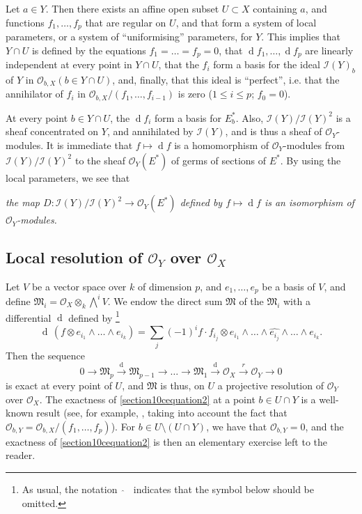 \documentclass{article}
\theoremstyle{plain}
\theoremstyle{definition}
\newcommand{\sh}{\mathscr}
\newcommand{\dd}{\operatorname{d}\!}
\renewcommand{\leq}{\leqslant}
\newcommand{\oldpage}[1]{\marginpar{\footnotesize$\Big\vert$ \textit{p.~#1}}}
\begin{document}
Let $a\in Y$.
Then there exists an affine open subset $U\subset X$ containing $a$, and functions $f_1,\ldots,f_p$ that are regular on $U$, and that form a system of local parameters, or a system of ``uniformising'' parameters, for $Y$.
This implies that $Y\cap U$ is defined by the equations $f_1=\ldots=f_p=0$, that $\dd f_1,\ldots,\dd f_p$ are linearly independent at every point in $Y\cap U$, that the $f_i$ form a basis for the ideal $\sh{I}(Y)_b$ of $Y$ in $\sh{O}_{b,X}(b\in Y\cap U)$, and, finally, that this ideal is ``perfect'', i.e. that the annihilator of $f_i$ in $\sh{O}_{b,X}/(f_1,\ldots,f_{i-1})$ is zero ($1\leq i\leq p$; $f_0=0$).

At every point $b\in Y\cap U$, the $\dd f_i$ form a basis for $E_b^*$.
Also, $\sh{I}(Y)/\sh{I}(Y)^2$ is a sheaf concentrated on $Y$, and annihilated by $\sh{I}(Y)$, and is thus a sheaf of $\sh{O}_Y$-modules.
It is immediate that $f\mapsto\dd f$ is a homomorphism of $\sh{O}_Y$-modules from $\sh{I}(Y)/\sh{I}(Y)^2$ to the sheaf $\sh{O}_Y(E^*)$ of germs of sections of $E^*$.
By using the local parameters, we see that

\medskip

\emph{the map $D\colon\sh{I}(Y)/\sh{I}(Y)^2 \to \sh{O}_Y(E^*)$ defined by $f\mapsto\dd f$ is an isomorphism of $\sh{O}_Y$-modules.}


\subsection{Local resolution of $\sh{O}_Y$ over $\sh{O}_X$}
\label{subsection10c}

Let $V$ be a vector space over $k$ of dimension $p$, and $e_1,\ldots,e_p$ be a basis of $V$, and define $\mathfrak{M}_i = \sh{O}_X\otimes_k\bigwedge\nolimits^i V$.
We endow the direct sum $\mathfrak{M}$ of the $\mathfrak{M}_i$ with a differential $\dd$ defined by
\footnote{As usual, the notation $\,\,\widehat{\,}\,\,\,$ indicates that the symbol below should be omitted.}
\[
  \dd\,(f\otimes e_{i_1}\wedge\ldots\wedge e_{i_k})
  = \sum_j (-1)^i f\cdot f_{i_j}\otimes e_{i_1}\wedge\ldots\wedge \widehat{e_{i_j}} \wedge\ldots\wedge e_{i_k}.
\]
Then the sequence
\[
\label{section10cequation2}
  0 \to \mathfrak{M}_p \xrightarrow{\mathrm{d}} \mathfrak{M}_{p-1} \to \ldots \to \mathfrak{M}_1 \xrightarrow{\mathrm{d}} \sh{O}_X \xrightarrow{r} \sh{O}_Y \to 0
  \tag{2}
\]
is exact at every point of $U$, and $\mathfrak{M}$ is thus, on $U$ a
\oldpage{121}
projective resolution of $\sh{O}_Y$ over $\sh{O}_X$.
The exactness of \cref{section10cequation2} at a point $b\in U\cap Y$ is a well-known result (see, for example, \cite[proposition~4.3, p.~151]{3}, taking into account the fact that $\sh{O}_{b,Y}=\sh{O}_{b,X}/(f_1,\ldots,f_p)$).
For $b\in U\setminus(U\cap Y)$, we have that $\sh{O}_{b,Y}=0$, and the exactness of \cref{section10cequation2} is then an elementary exercise left to the reader.
\end{document}
